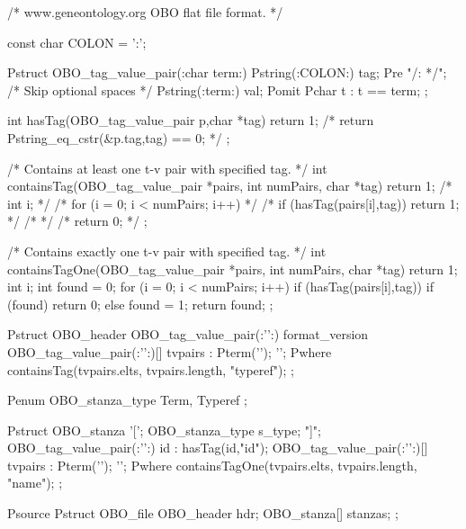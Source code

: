 /* www.geneontology.org OBO flat file format. */

const char COLON = ':';

Pstruct OBO_tag_value_pair(:char term:){
  Pstring(:COLON:) tag; 
  Pre "/: */";             /* Skip optional spaces */
  Pstring(:term:) val;
  Pomit Pchar t : t == term;
};

int hasTag(OBO_tag_value_pair p,char *tag){
  return 1;
/*   return Pstring_eq_cstr(&p.tag,tag) == 0; */
};


/* Contains at least one t-v pair with specified tag. */
int containsTag(OBO_tag_value_pair *pairs, int numPairs, char *tag){
  return 1;
/*   int i; */
/*   for (i = 0; i < numPairs; i++){ */
/*     if (hasTag(pairs[i],tag)) return 1; */
/*   } */
/*   return 0; */
};


/* Contains exactly one t-v pair with specified tag. */
int containsTagOne(OBO_tag_value_pair *pairs, int numPairs, char *tag){
  return 1;
   int i; 
   int found = 0; 
   for (i = 0; i < numPairs; i++){ 
     if (hasTag(pairs[i],tag)){ 
       if (found) return 0; 
       else found = 1; 
     } 
   } 
   return found; 
};

Pstruct OBO_header{
  OBO_tag_value_pair(:'\n':)   format_version 
  OBO_tag_value_pair(:'\n':)[] tvpairs  : Pterm('\n');  '\n';
} Pwhere {
  containsTag(tvpairs.elts, tvpairs.length, "typeref");
};

Penum OBO_stanza_type{
  Term,
  Typeref
};

Pstruct OBO_stanza{
  '['; OBO_stanza_type s_type; "]\n";
  OBO_tag_value_pair(:'\n':)   id     : hasTag(id,"id");
  OBO_tag_value_pair(:'\n':)[] tvpairs : Pterm('\n');
  '\n';
} Pwhere {
  containsTagOne(tvpairs.elts, tvpairs.length, "name");
};

Psource Pstruct OBO_file{
  OBO_header hdr;
  OBO_stanza[] stanzas;
};
